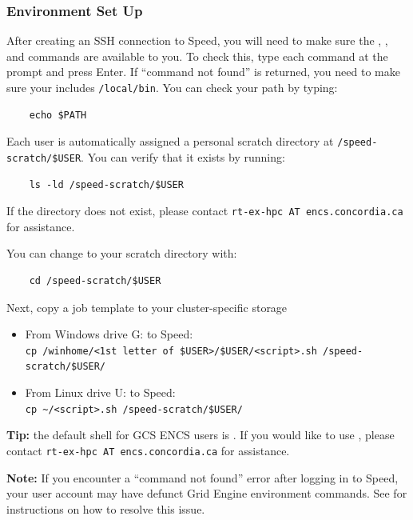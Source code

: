 \subsubsection{Environment Set Up}
\label{sect:envsetup}

After creating an SSH connection to Speed, you will need to make sure the , , and 
commands are available to you. To check this, type each command at the prompt and press Enter.
If ``command not found'' is returned, you need to make sure your  includes \texttt{/local/bin}.
You can check your path by typing:
\begin{verbatim}
    echo $PATH
\end{verbatim}

\noindent Each user is automatically assigned a personal scratch directory at
\texttt{/speed-scratch/\$USER}. You can verify that it exists by running:
\begin{verbatim}
    ls -ld /speed-scratch/$USER
\end{verbatim}

\noindent If the directory does not exist, please contact \texttt{rt-ex-hpc AT encs.concordia.ca} for assistance.

\noindent You can change to your scratch directory with:
\begin{verbatim}
    cd /speed-scratch/$USER
\end{verbatim}

\noindent Next, copy a job template to your cluster-specific storage
\begin{itemize}
    \item From Windows drive G: to Speed:\\
    \verb|cp /winhome/<1st letter of $USER>/$USER/<script>.sh /speed-scratch/$USER/|
    \item From Linux drive U: to Speed:\\
    \verb|cp ~/<script>.sh /speed-scratch/$USER/|
\end{itemize}

\noindent \textbf{Tip:} the default shell for GCS ENCS users is .
If you would like to use , please contact \texttt{rt-ex-hpc AT encs.concordia.ca} for assistance.

\noindent \textbf{Note:} If you encounter a ``command not found'' error after logging in to Speed,
your user account may have defunct Grid Engine environment commands.
See  for instructions on how to resolve this issue.